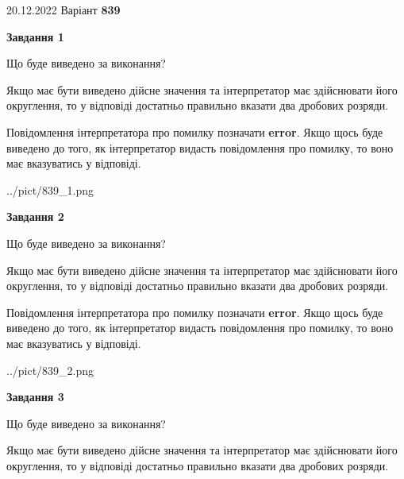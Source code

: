 \documentclass[12pt, ukrainian]{article}
\begin{document}
{20.12.2022 Варіант \No \textbf { 839 }\par}
{
\begin {Large}

{\begin {center}\textbf{Завдання 1}\end {center}}\par
Що буде виведено за виконання? \par

Якщо має бути виведено дійсне значення та інтерпретатор має здійснювати його округлення, 
то у відповіді достатньо правильно вказати два дробових розряди.

Повідомлення інтерпретатора про помилку позначати \textbf{error}.
Якщо щось буде виведено до того, як інтерпретатор видасть повідомлення про помилку, 
то воно має вказуватись у відповіді. \par

\begin{center}
	{../pict/839_1.png}
\end{center}
\newpage

{\begin {center}\textbf{Завдання 2}\end {center}}\par
Що буде виведено за виконання? \par

Якщо має бути виведено дійсне значення та інтерпретатор має здійснювати його округлення, 
то у відповіді достатньо правильно вказати два дробових розряди.

Повідомлення інтерпретатора про помилку позначати \textbf{error}.
Якщо щось буде виведено до того, як інтерпретатор видасть повідомлення про помилку, 
то воно має вказуватись у відповіді. \par

\begin{center}
	{../pict/839_2.png}
\end{center}
\newpage

{\begin {center}\textbf{Завдання 3}\end {center}}\par
Що буде виведено за виконання? \par

Якщо має бути виведено дійсне значення та інтерпретатор має здійснювати його округлення, 
то у відповіді достатньо правильно вказати два дробових розряди.


\end{Large}}
\end{document}
